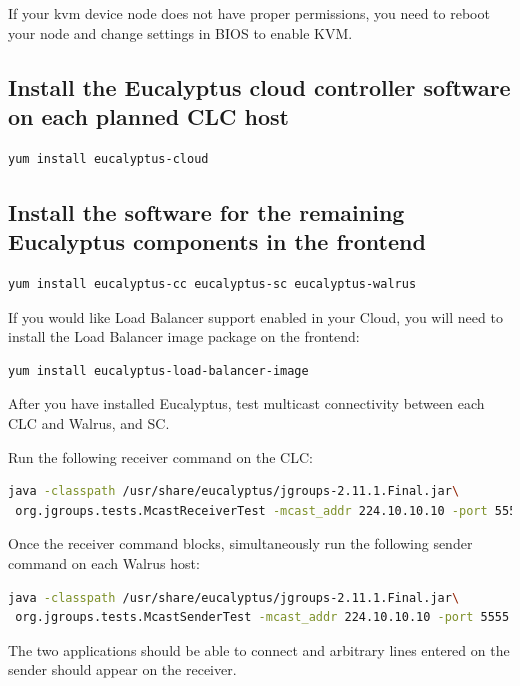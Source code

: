 If your kvm device node does not have proper permissions, you need to reboot your node and change settings in BIOS to enable KVM.
\\ \linebreak
\subsection{Install the Eucalyptus cloud controller software on each planned CLC host}
\begin{lstlisting}[language=bash]
yum install eucalyptus-cloud
\end{lstlisting}
\subsection{Install the software for the remaining Eucalyptus components in the frontend}
\begin{lstlisting}[language=bash]
yum install eucalyptus-cc eucalyptus-sc eucalyptus-walrus
\end{lstlisting}
If you would like Load Balancer support enabled in your Cloud, you will need to install the Load Balancer image package on the frontend:
\begin{lstlisting}[language=bash]
yum install eucalyptus-load-balancer-image
\end{lstlisting}

After you have installed Eucalyptus, test multicast connectivity between each CLC and Walrus, and SC.
\\ \linebreak

Run the following receiver command on the CLC:
\begin{lstlisting}[language=bash]
java -classpath /usr/share/eucalyptus/jgroups-2.11.1.Final.jar\
 org.jgroups.tests.McastReceiverTest -mcast_addr 224.10.10.10 -port 5555
\end{lstlisting}

Once the receiver command blocks, simultaneously run the following sender command on each Walrus host:
\begin{lstlisting}[language=bash]
java -classpath /usr/share/eucalyptus/jgroups-2.11.1.Final.jar\
 org.jgroups.tests.McastSenderTest -mcast_addr 224.10.10.10 -port 5555
\end{lstlisting}

The two applications should be able to connect and arbitrary lines entered on the sender should appear on the receiver.




